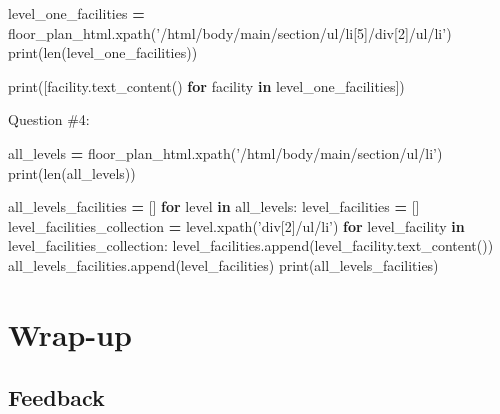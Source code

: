 \documentclass[]{book}
\newenvironment{Shaded}{\begin{snugshade}}{\end{snugshade}}
\newcommand{\KeywordTok}[1]{\textcolor[rgb]{0.13,0.29,0.53}{\textbf{#1}}}
\newcommand{\StringTok}[1]{\textcolor[rgb]{0.31,0.60,0.02}{#1}}
\newcommand{\ControlFlowTok}[1]{\textcolor[rgb]{0.13,0.29,0.53}{\textbf{#1}}}
\newcommand{\OperatorTok}[1]{\textcolor[rgb]{0.81,0.36,0.00}{\textbf{#1}}}
\newcommand{\BuiltInTok}[1]{#1}
\newcommand{\NormalTok}[1]{#1}
\begin{document}
\begin{Shaded}
\begin{Highlighting}[]
\NormalTok{level_one_facilities }\OperatorTok{=}\NormalTok{ floor_plan_html.xpath(}\StringTok{'/html/body/main/section/ul/li[5]/div[2]/ul/li'}\NormalTok{)}
\BuiltInTok{print}\NormalTok{(}\BuiltInTok{len}\NormalTok{(level_one_facilities))}
\end{Highlighting}
\end{Shaded}

\begin{Shaded}
\begin{Highlighting}[]
\BuiltInTok{print}\NormalTok{([facility.text_content() }\ControlFlowTok{for}\NormalTok{ facility }\KeywordTok{in}\NormalTok{ level_one_facilities])}
\end{Highlighting}
\end{Shaded}

Question \#4:

\begin{Shaded}
\begin{Highlighting}[]
\NormalTok{all_levels }\OperatorTok{=}\NormalTok{ floor_plan_html.xpath(}\StringTok{'/html/body/main/section/ul/li'}\NormalTok{)}
\BuiltInTok{print}\NormalTok{(}\BuiltInTok{len}\NormalTok{(all_levels))}
\end{Highlighting}
\end{Shaded}

\begin{Shaded}
\begin{Highlighting}[]
\NormalTok{all_levels_facilities }\OperatorTok{=}\NormalTok{ []}
\ControlFlowTok{for}\NormalTok{ level }\KeywordTok{in}\NormalTok{ all_levels:}
\NormalTok{    level_facilities }\OperatorTok{=}\NormalTok{ []}
\NormalTok{    level_facilities_collection }\OperatorTok{=}\NormalTok{ level.xpath(}\StringTok{'div[2]/ul/li'}\NormalTok{)}
    \ControlFlowTok{for}\NormalTok{ level_facility }\KeywordTok{in}\NormalTok{ level_facilities_collection:}
\NormalTok{        level_facilities.append(level_facility.text_content())}
\NormalTok{    all_levels_facilities.append(level_facilities)}
\BuiltInTok{print}\NormalTok{(all_levels_facilities)}
\end{Highlighting}
\end{Shaded}

\section{Wrap-up}\label{wrap-up-6}

\subsection{Feedback}\label{feedback-6}
\end{document}
